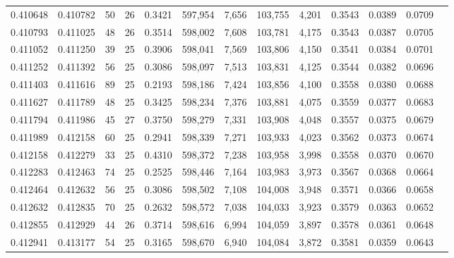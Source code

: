 \begin{tabular}{rrrrrrrrrrrrr}
0.410648 & 0.410782 &    50 &  26 &                                     0.3421 & 597,954 &   7,656 & 103,755 &   4,201 & 0.3543 & 0.0389 & 0.0709 \\
0.410793 & 0.411025 &    48 &  26 &                                     0.3514 & 598,002 &   7,608 & 103,781 &   4,175 & 0.3543 & 0.0387 & 0.0705 \\
0.411052 & 0.411250 &    39 &  25 &                                     0.3906 & 598,041 &   7,569 & 103,806 &   4,150 & 0.3541 & 0.0384 & 0.0701 \\
0.411252 & 0.411392 &    56 &  25 &                                     0.3086 & 598,097 &   7,513 & 103,831 &   4,125 & 0.3544 & 0.0382 & 0.0696 \\
0.411403 & 0.411616 &    89 &  25 &                                     0.2193 & 598,186 &   7,424 & 103,856 &   4,100 & 0.3558 & 0.0380 & 0.0688 \\
0.411627 & 0.411789 &    48 &  25 &                                     0.3425 & 598,234 &   7,376 & 103,881 &   4,075 & 0.3559 & 0.0377 & 0.0683 \\
0.411794 & 0.411986 &    45 &  27 &                                     0.3750 & 598,279 &   7,331 & 103,908 &   4,048 & 0.3557 & 0.0375 & 0.0679 \\
0.411989 & 0.412158 &    60 &  25 &                                     0.2941 & 598,339 &   7,271 & 103,933 &   4,023 & 0.3562 & 0.0373 & 0.0674 \\
0.412158 & 0.412279 &    33 &  25 &                                     0.4310 & 598,372 &   7,238 & 103,958 &   3,998 & 0.3558 & 0.0370 & 0.0670 \\
0.412283 & 0.412463 &    74 &  25 &                                     0.2525 & 598,446 &   7,164 & 103,983 &   3,973 & 0.3567 & 0.0368 & 0.0664 \\
0.412464 & 0.412632 &    56 &  25 &                                     0.3086 & 598,502 &   7,108 & 104,008 &   3,948 & 0.3571 & 0.0366 & 0.0658 \\
0.412632 & 0.412835 &    70 &  25 &                                     0.2632 & 598,572 &   7,038 & 104,033 &   3,923 & 0.3579 & 0.0363 & 0.0652 \\
0.412855 & 0.412929 &    44 &  26 &                                     0.3714 & 598,616 &   6,994 & 104,059 &   3,897 & 0.3578 & 0.0361 & 0.0648 \\
0.412941 & 0.413177 &    54 &  25 &                                     0.3165 & 598,670 &   6,940 & 104,084 &   3,872 & 0.3581 & 0.0359 & 0.0643 \\

\end{tabular}
